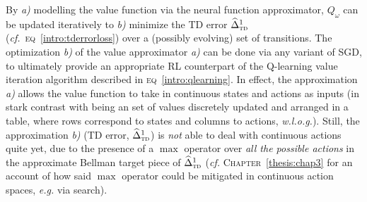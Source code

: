 By \textit{a)} modelling the value function via the neural function approximator,
$Q_\omega$ can be updated iteratively to \textit{b)} minimize the TD error
$\widehat{\Delta}_\textsc{td}^1$
(\textit{cf.}~\textsc{eq}~\ref{intro:tderrorloss})
over a (possibly evolving) set of transitions.
The optimization \textit{b)} of the value approximator \textit{a)} can be done via any variant of SGD,
to ultimately provide an appropriate RL counterpart of the Q-learning value iteration algorithm described in
\textsc{eq}~\ref{intro:qlearning}.
In effect, the approximation \textit{a)} allows the value function to take in continuous states
and actions as inputs (in stark contrast with being an set of values discretely updated and
arranged in a table, where
rows correspond to states and columns to actions, \textit{w.l.o.g.}).
Still, the approximation \textit{b)} (TD error, $\widehat{\Delta}_\textsc{td}^1$) is \emph{not}
able to deal with continuous actions quite yet, due to the presence of a $\max$ operator over
\emph{all the possible actions} in the approximate Bellman target piece of $\widehat{\Delta}_\textsc{td}^1$
(\textit{cf.} \textsc{Chapter}~\ref{thesis:chap3} for an account of how said $\max$ operator could be mitigated
in continuous action spaces, \textit{e.g.} via search).

